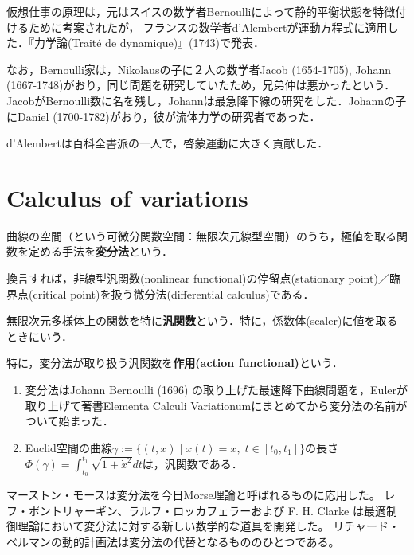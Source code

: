 \documentclass[uplatex, 12pt, dvipdfmx]{jsreport}
\begin{document}
\begin{axiom}

\end{axiom}
\begin{remark}
    仮想仕事の原理は，元はスイスの数学者Bernoulliによって静的平衡状態を特徴付けるために考案されたが，
    フランスの数学者d'Alembertが運動方程式に適用した．『力学論(Traité de dynamique)』(1743)で発表．

    なお，Bernoulli家は，Nikolausの子に２人の数学者Jacob (1654-1705), Johann (1667-1748)がおり，同じ問題を研究していたため，兄弟仲は悪かったという．
    JacobがBernoulli数に名を残し，Johannは最急降下線の研究をした．Johannの子にDaniel (1700-1782)がおり，彼が流体力学の研究者であった．

    d'Alembertは百科全書派の一人で，啓蒙運動に大きく貢献した．
\end{remark}

\section{Calculus of variations}

\begin{definition}
    曲線の空間（という可微分関数空間：無限次元線型空間）のうち，極値を取る関数を定める手法を\textbf{変分法}という．

    換言すれば，非線型汎関数(nonlinear functional)の停留点(stationary point)／臨界点(critical point)を扱う微分法(differential calculus)である．
\end{definition}

\begin{definition}[functional]
    無限次元多様体上の関数を特に\textbf{汎関数}という．特に，係数体(scaler)に値を取るときにいう．

    特に，変分法が取り扱う汎関数を\textbf{作用(action functional)}という．
\end{definition}
\begin{example}[汎関数の例]\mbox{}
    \begin{enumerate}
        \item 変分法はJohann Bernoulli (1696) の取り上げた最速降下曲線問題を，Eulerが取り上げて著書Elementa Calculi Variationumにまとめてから変分法の名前がついて始まった．
        \item Euclid空間の曲線$\gamma:=\{(t,x)\mid x(t)=x,\; t\in[t_0,t_1]\}$の長さ$\Phi(\gamma)=\int^{t_1}_{t_0}\sqrt{1+\dot{x}^2}dt$は，汎関数である．
    \end{enumerate}
\end{example}
\begin{history}
    マーストン・モースは変分法を今日Morse理論と呼ばれるものに応用した。
    レフ・ポントリャーギン、ラルフ・ロッカフェラーおよび F. H. Clarke は最適制御理論において変分法に対する新しい数学的な道具を開発した。
    リチャード・ベルマンの動的計画法は変分法の代替となるもののひとつである。
\end{history}
\end{document}
